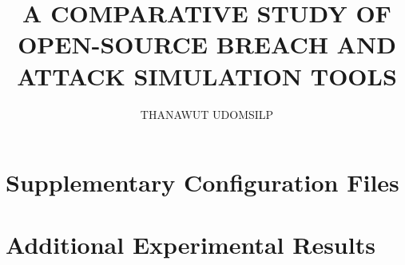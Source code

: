 \documentclass{muthesis2026}
\title{A COMPARATIVE STUDY OF OPEN-SOURCE BREACH AND ATTACK SIMULATION TOOLS}
\author{THANAWUT UDOMSILP}
\begin{document}
\maketitle
{}


\tableofcontents
\listoftables
\listoffigures


\appendices  %
\makeatletter
\renewcommand{\theHchapter}{appendix.\arabic{chapter}}
\makeatother
\chapter{Supplementary Configuration Files}\label{app:configs}

\chapter{Additional Experimental Results}\label{app:results}


\biography %
\end{document}
